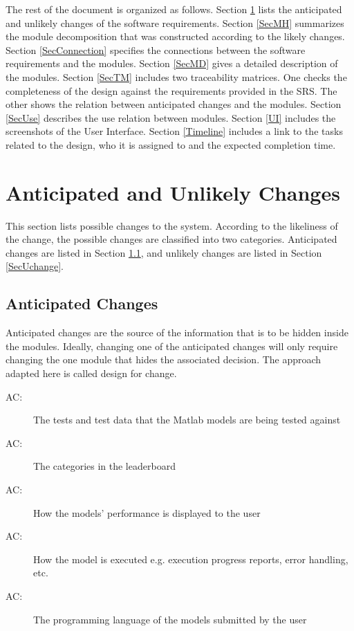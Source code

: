 \documentclass[12pt, titlepage]{article}
\newcounter{acnum}
\newcommand{\actheacnum}{AC\theacnum}
\begin{document}
The rest of the document is organized as follows. Section
\ref{SecChange} lists the anticipated and unlikely changes of the software
requirements. Section \ref{SecMH} summarizes the module decomposition that
was constructed according to the likely changes. Section \ref{SecConnection}
specifies the connections between the software requirements and the
modules. Section \ref{SecMD} gives a detailed description of the
modules. Section \ref{SecTM} includes two traceability matrices. One checks
the completeness of the design against the requirements provided in the SRS. The
other shows the relation between anticipated changes and the modules. Section
\ref{SecUse} describes the use relation between modules. Section
\ref{UI} includes the screenshots of the User Interface. Section \ref{Timeline} includes a link to the tasks related to the design, who it is assigned to and the expected completion time.

\section{Anticipated and Unlikely Changes} \label{SecChange}

This section lists possible changes to the system. According to the likeliness
of the change, the possible changes are classified into two
categories. Anticipated changes are listed in Section \ref{SecAchange}, and
unlikely changes are listed in Section \ref{SecUchange}.

\subsection{Anticipated Changes} \label{SecAchange}

Anticipated changes are the source of the information that is to be hidden
inside the modules. Ideally, changing one of the anticipated changes will only
require changing the one module that hides the associated decision. The approach
adapted here is called design for
change.

\begin{description}
\item[ \actheacnum \label{acTest}:] The tests and test data that the Matlab models are being tested against
\item[ \actheacnum \label{acLeaderboard}:] The categories in the leaderboard
\item[ \actheacnum \label{acDisplay}:] How the models' performance is displayed to the user
\item[ \actheacnum \label{acExecute}:] How the model is executed e.g. execution progress reports, error handling, etc. 
\item[ \actheacnum \label{acLanguage}:] The programming language of the models submitted by the user
\end{description}
\end{document}
